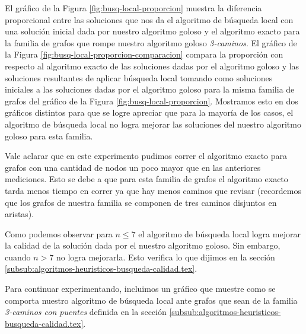 El gráfico de la Figura \ref{fig:busq-local-proporcion} muestra la diferencia proporcional entre las soluciones que nos da el algoritmo de búsqueda local con una solución inicial dada por nuestro algoritmo goloso y el algoritmo exacto para la familia de grafos que rompe nuestro algoritmo goloso \emph{3-caminos}. El gráfico de la Figura \ref{fig:busq-local-proporcion-comparacion} compara la proporción con respecto al algoritmo exacto de las soluciones dadas por el algoritmo goloso y las soluciones resultantes de aplicar búsqueda local tomando como soluciones iniciales a las soluciones dadas por el algoritmo goloso para la misma familia de grafos del gráfico de la Figura \ref{fig:busq-local-proporcion}. Mostramos esto en dos gráficos distintos para que se logre apreciar que para la mayoría de los casos, el algoritmo de búsqueda local no logra mejorar las soluciones del nuestro algoritmo goloso para esta familia.

Vale aclarar que en este experimento pudimos correr el algoritmo exacto para grafos con una cantidad de nodos un poco mayor que en las anteriores mediciones. Esto se debe a que para esta familia de grafos el algoritmo exacto tarda menos tiempo en correr ya que hay menos caminos que revisar (recordemos que los grafos de nuestra familia se componen de tres caminos disjuntos en aristas).

Como podemos observar para $n \leq 7$ el algoritmo de búsqueda local logra mejorar la calidad de la solución dada por el nuestro algoritmo goloso. Sin embargo, cuando $n > 7$ no logra mejorarla. Esto verifica lo que dijimos en la sección \ref{subsub:algoritmos-heuristicos-busqueda-calidad.tex}.

Para continuar experimentando, incluimos un gráfico que muestre como se comporta nuestro algoritmo de búsqueda local ante grafos que sean de la familia \emph{3-caminos con puentes} definida en la sección \ref{subsub:algoritmos-heuristicos-busqueda-calidad.tex}. 

